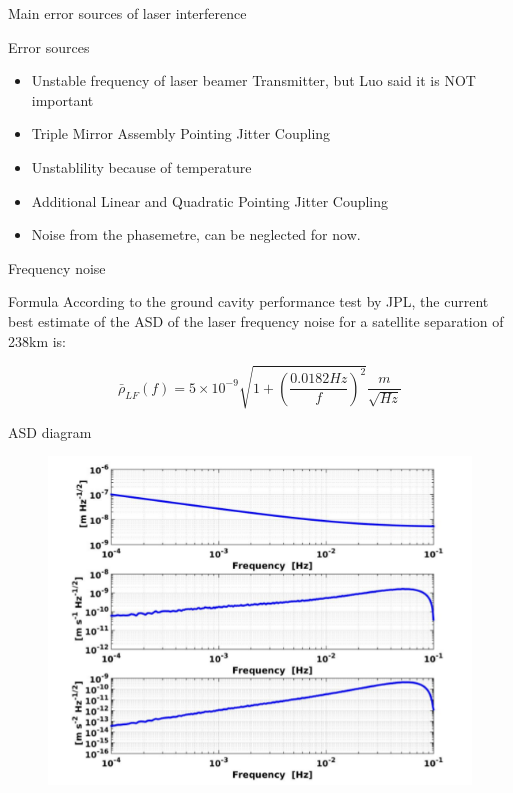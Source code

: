 \documentclass{beamer}
\begin{document}
\begin{frame}[fragile]{Main error sources of laser interference}
    \begin{block}{Error sources}
        \begin{itemize}
            \item Unstable frequency of laser beamer Transmitter, \alert{but Luo said it is NOT important}
            \item Triple Mirror Assembly Pointing Jitter Coupling
            \item Unstablility because of temperature
            \item Additional Linear and Quadratic Pointing Jitter Coupling
            \item Noise from the phasemetre, can be neglected for now.
        \end{itemize}
    \end{block}
\end{frame}

\begin{frame}[fragile]{Frequency noise} 
    \begin{block}{Formula}
        According to the ground cavity performance test by JPL, the current best estimate of the
        ASD of the laser frequency noise for a satellite separation of 238km is:

        \begin{equation}
            \bar{\rho}_{LF}(f)=5 \times 10^{-9} \sqrt{1+(\frac{0.0182Hz}{f})^2} \frac{m}{\sqrt{Hz}}
        \end{equation}
    \end{block}
\end{frame}

\begin{frame}[fragile]{ASD diagram}
    \begin{figure}
        \includegraphics[width=0.8\linewidth]{images/freq.png}
    \end{figure}
\end{frame}
\end{document}
